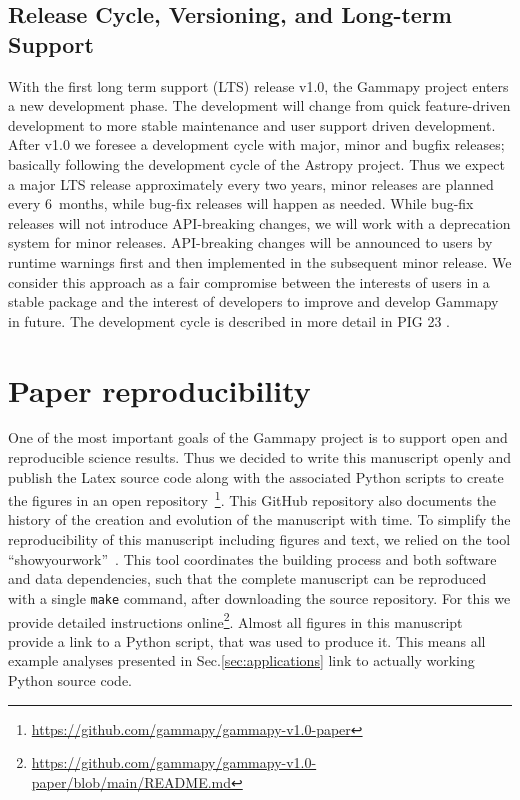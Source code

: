 \documentclass[longauth]{aa}
\newcommand{\code}[1]{\texttt{#1}}
\newcommand{\gammapy}{Gammapy\xspace}
\newcommand{\github}{GitHub\xspace}
\begin{document}
\subsection{Release Cycle, Versioning, and Long-term Support}
\label{ssec:release-cycle}
With the first long term support (LTS) release v1.0, the \gammapy project
enters a new development phase. The development will change from
quick feature-driven development to more stable maintenance
and user support driven development. After v1.0 we foresee
a development cycle with major, minor and bugfix releases;
basically following the development cycle of the Astropy
project. Thus we expect a major LTS release approximately
every two years, minor releases are planned every 6~months,
while bug-fix releases will happen as needed. While
bug-fix releases will not introduce API-breaking changes,
we will work with a deprecation system for minor releases.
API-breaking changes will be announced to users by runtime
warnings first and then implemented in the subsequent
minor release. We consider this approach as a fair
compromise between the interests of users in a stable
package and the interest of developers to improve
and develop \gammapy in future. The development cycle is described
in more detail in PIG 23 \citep{gammapy_pig_23}.

\section{Paper reproducibility}
\label{sec:reproducibility}
One of the most important goals of the \gammapy project is to support open and
reproducible science results. Thus we decided to write this manuscript
openly and publish the Latex source code along with the associated
Python scripts to create the figures
in an open repository~\footnote{\url{https://github.com/gammapy/gammapy-v1.0-paper}}.
This \github repository also documents the history of the creation
and evolution of the manuscript with time. To simplify the reproducibility
of this manuscript including figures and text, we relied on the tool
\enquote{showyourwork}~\citep{Luger2021}. This tool coordinates the building
process and both software and data dependencies, such that the complete
manuscript can be reproduced with a single \code{make} command, after
downloading the source repository. For this we provide
detailed instructions online\footnote{\url{https://github.com/gammapy/gammapy-v1.0-paper/blob/main/README.md}}.
Almost all figures in this manuscript provide a link
to a Python script, that was used to produce it. This means all
example analyses presented in Sec.\ref{sec:applications} link to
actually working Python source code.
\end{document}
